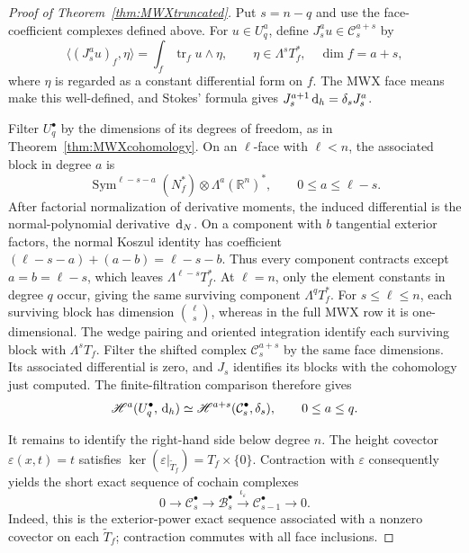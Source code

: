 \documentclass[10pt]{amsart}
\numberwithin{equation}{section}
\newcommand{\dd}{\,{\rm d}}
\newcommand{\tr}{\operatorname{tr}}
\begin{document}
\begin{proof}[Proof of Theorem~\ref{thm:MWXtruncated}]
Put $s=n-q$ and use the face-coefficient complexes defined above.
For $u\in U_q^a$, define $J_s^a u\in\mathcal C_s^{a+s}$ by
\[
\langle(J_s^a u)_f,\eta\rangle
=\int_f\tr_f u\wedge\eta,
\qquad \eta\in\Lambda^sT_f^*,\quad \dim f=a+s,
\]
where $\eta$ is regarded as a constant differential form on $f$.
The MWX face means make this well-defined, and Stokes' formula gives
$J_s^{a+1}\dd_h=\delta_sJ_s^a$.

Filter $U_q^\bullet$ by the dimensions of its degrees of freedom, as in
Theorem~\ref{thm:MWXcohomology}. On an $\ell$-face with $\ell<n$, the
associated block in degree $a$ is
\[
\operatorname{Sym}^{\ell-s-a}(N_f^*)\otimes\Lambda^a(\mathbb R^n)^*,
\qquad 0\leq a\leq\ell-s.
\]
After factorial normalization of derivative moments, the induced
differential is the normal-polynomial derivative $\dd_N$.
On a component with $b$ tangential exterior factors, the normal Koszul
identity has coefficient
$(\ell-s-a)+(a-b)=\ell-s-b$.
Thus every component contracts except
$a=b=\ell-s$, which leaves $\Lambda^{\ell-s}T_f^*$.
At $\ell=n$, only the element constants in degree $q$ occur, giving the
same surviving component $\Lambda^qT_f^*$.
For $s\leq\ell\leq n$, each surviving block has dimension
$\binom{\ell}{s}$, whereas in the full MWX row it is one-dimensional.
The wedge pairing and oriented integration identify each surviving block
with $\Lambda^sT_f$.
Filter the shifted complex $\mathcal C_s^{a+s}$ by the same face dimensions.
Its associated differential is zero, and $J_s$ identifies its blocks with
the cohomology just computed. The finite-filtration comparison therefore gives
\begin{equation}\label{eq:MWXtruncatedFaceCohomology}
\mathscr H^a(U_q^\bullet,\dd_h)\simeq \mathscr H^{a+s}(\mathcal C_s^\bullet,\delta_s),
\qquad 0\leq a\leq q.
\end{equation}

It remains to identify the right-hand side below degree $n$.
The height covector $\varepsilon(x,t)=t$ satisfies
$\ker(\varepsilon|_{\widetilde T_f})=T_f\times\{0\}$.
Contraction with $\varepsilon$ consequently yields the short exact sequence
of cochain complexes
\begin{equation}\label{eq:MWXfaceCoefficientSES}
0\longrightarrow\mathcal C_s^\bullet
\longrightarrow\mathcal B_s^\bullet
\xrightarrow{\iota_\varepsilon}\mathcal C_{s-1}^\bullet
\longrightarrow0.
\end{equation}
Indeed, this is the exterior-power exact sequence associated with a
nonzero covector on each $\widetilde T_f$; contraction commutes with all
face inclusions.


\end{proof}
\end{document}

